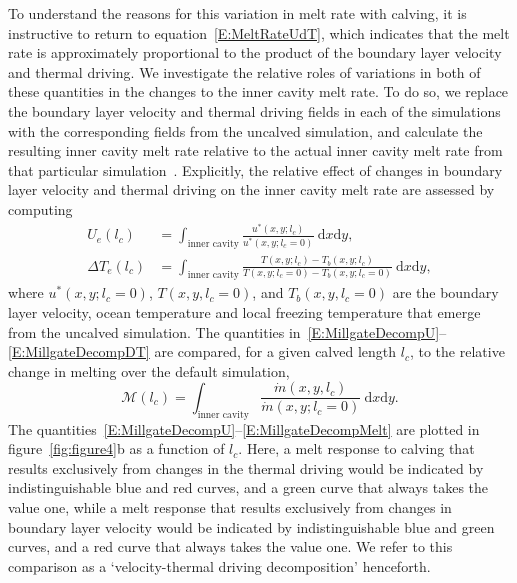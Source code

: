 \documentclass[draft]{agujournal2019}
\begin{document}
To understand the reasons for this variation in melt rate with calving, it is instructive to return to equation~\eqref{E:MeltRateUdT}, which indicates that the melt rate is approximately proportional to the product of the boundary layer velocity and thermal driving. We investigate the relative roles of variations in both of these quantities in the changes to the inner cavity melt rate. To do so, we replace the boundary layer velocity and thermal driving fields in each of the simulations with the corresponding fields from the uncalved simulation, and calculate the resulting inner cavity melt rate relative to the actual inner cavity melt rate from that particular simulation~\cite{Millgate2013JGROceans}. Explicitly, the relative effect of changes in boundary layer velocity and thermal driving on the inner cavity melt rate are assessed by computing
 \begin{align}
U_{e}(l_c) &=  \int_{\text{inner cavity}}\frac{u^*(x,y; l_c)}{u^*(x,y; l_c = 0)}~\mathrm{d}x\mathrm{d}y, \label{E:MillgateDecompU}\\ \Delta T_{e}(l_c) &= \int_{\text{inner cavity}}\frac{T(x,y; l_c) - T_b(x,y; l_c)}{T(x,y; l_c = 0) - T_{b}(x,y; l_c = 0)}~\mathrm{d}x\mathrm{d}y,\label{E:MillgateDecompDT}
 \end{align}
  where $u^*(x,y;l_c = 0)$, $T(x,y,l_c = 0)$, and $T_b(x,y,l_c = 0)$ are the boundary layer velocity, ocean temperature and local freezing temperature that emerge from the uncalved simulation. The quantities in~\eqref{E:MillgateDecompU}--\eqref{E:MillgateDecompDT} are compared, for a given calved length $l_c$, to the relative change in melting over the default simulation,
 \begin{equation}\label{E:MillgateDecompMelt}
   \mathcal{M}(l_c) =  \int_{\text{inner cavity}}\frac{\dot{m}(x,y, l_c)}{\dot{m}(x,y; l_c = 0)}~\mathrm{d}x\mathrm{d}y.
 \end{equation}
The quantities~\eqref{E:MillgateDecompU}--\eqref{E:MillgateDecompMelt} are plotted in figure~\ref{fig:figure4}b as a function of $l_c$.  Here, a melt response to calving that results exclusively from changes in the thermal driving would be indicated by indistinguishable blue and red curves, and a green curve that always takes the value one, while a melt response that results exclusively from changes in boundary layer velocity would be indicated by indistinguishable blue and green curves, and a red curve that always takes the value one. We refer to this comparison as a `velocity-thermal driving decomposition' henceforth. %
\end{document}
